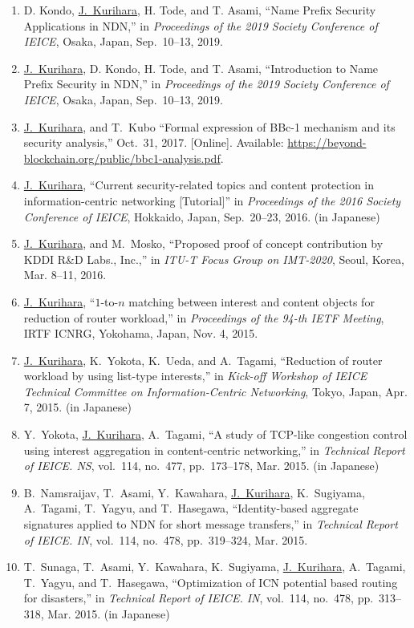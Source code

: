 \begin{enumerate}
 \item D. Kondo, \underline{J.~Kurihara}, H. Tode, and T. Asami, ``Name Prefix Security Applications in NDN,'' in \textit{Proceedings of the 2019 Society Conference of IEICE}, Osaka, Japan, Sep.~10--13, 2019.
 \item \underline{J.~Kurihara}, D. Kondo, H. Tode, and T. Asami, ``Introduction to Name Prefix Security in NDN,'' in \textit{Proceedings of the 2019 Society Conference of IEICE}, Osaka, Japan, Sep.~10--13, 2019.
 \item \underline{J.~Kurihara}, and T.~Kubo ``Formal expression of BBc-1 mechanism and its security analysis,'' Oct.~31, 2017. [Online]. Available: \url{https://beyond-blockchain.org/public/bbc1-analysis.pdf}.
 \item \underline{J.~Kurihara}, ``Current security-related topics and content protection in information-centric networking [Tutorial]'' in \textit{Proceedings of the 2016 Society Conference of IEICE}, Hokkaido, Japan, Sep.~20--23, 2016. (in Japanese)
 \item \underline{J.~Kurihara}, and M.~Mosko, ``Proposed proof of concept contribution by KDDI R\&D Labs., Inc.,'' in \textit{ITU-T Focus Group on IMT-2020}, Seoul, Korea, Mar. 8--11, 2016.
 \item \underline{J.~Kurihara}, ``$1$-to-$n$ matching between interest and content objects for reduction of router workload,'' in \textit{Proceedings of the 94-th IETF Meeting}, IRTF ICNRG, Yokohama, Japan, Nov. 4, 2015.
 \item \underline{J.~Kurihara}, K.~Yokota, K.~Ueda, and A.~Tagami, ``Reduction of router workload by using list-type interests,'' in \textit{Kick-off Workshop of IEICE Technical Committee on Information-Centric Networking}, Tokyo, Japan, Apr. 7, 2015. (in Japanese)
 \item Y.~Yokota, \underline{J.~Kurihara}, A.~Tagami, ``A study of TCP-like congestion control using interest aggregation in content-centric networking,'' in \textit{Technical Report of IEICE. NS}, vol.~114, no.~477, pp.~173--178, Mar. 2015. (in Japanese)
 \item B.~Namsraijav, T.~Asami, Y.~Kawahara, \underline{J.~Kurihara}, K.~Sugiyama, A.~Tagami, T.~Yagyu, and T.~Hasegawa, ``Identity-based aggregate signatures applied to NDN for short message transfers,'' in \textit{Technical Report of IEICE. IN}, vol.~114, no.~478, pp.~319--324, Mar. 2015.
 \item T.~Sunaga, T.~Asami, Y.~Kawahara, K.~Sugiyama, \underline{J.~Kurihara}, A.~Tagami, T.~Yagyu, and T.~Hasegawa, ``Optimization of ICN potential based routing for disasters,'' in \textit{Technical Report of IEICE. IN}, vol.~114, no.~478, pp.~313--318, Mar. 2015. (in Japanese)

\end{enumerate}
